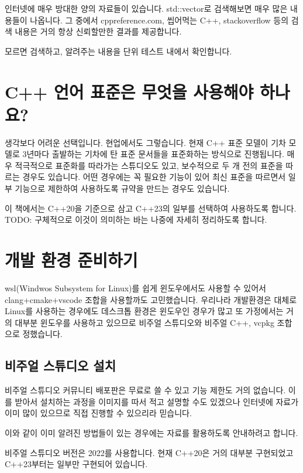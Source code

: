 인터넷에 매우 방대한 양의 자료들이 있습니다. std::vector로 검색해보면 매우 
많은 내용들이 나옵니다. 그 중에서 cppreference.com, 씹어먹는 C++, stackoverflow
등의 검색 내용은 거의 항상 신뢰할만한 결과를 제공합니다. 

모르면 검색하고, 알려주는 내용을 단위 테스트 내에서 확인합니다. 

\section{C++ 언어 표준은 무엇을 사용해야 하나요?}

생각보다 어려운 선택입니다. 현업에서도 그렇습니다. 현재 C++ 표준 모델이 기차 모델로 
3년마다 출발하는 기차에 탄 표준 문서들을 표준화하는 방식으로 진행됩니다. 매우 적극적으로 
표준화를 따라가는 스튜디오도 있고, 보수적으로 두 개 전의 표준을 따르는 경우도 있습니다. 
어떤 경우에는 꼭 필요한 기능이 있어 최신 표준을 따르면서 일부 기능으로 제한하여 
사용하도록 규약을 만드는 경우도 있습니다. 

이 책에서는 C++20을 기준으로 삼고 C++23의 일부를 선택하여 사용하도록 합니다. 
TODO: 구체적으로 이것이 의미하는 바는 나중에 자세히 정리하도록 합니다. 

\section{개발 환경 준비하기}

wsl(Windwos Subsystem for Linux)를 쉽게 윈도우에서도 사용할 수 있어서 clang+cmake+vscode
조합을 사용할까도 고민했습니다. 우리나라 개발환경은 대체로 Linux를 사용하는 경우에도 
데스크톱 환경은 윈도우인 경우가 많고 또 가정에서는 거의 대부분 윈도우를 사용하고 있으므로 
비주얼 스튜디오와 비주얼 C++, vcpkg 조합으로 정했습니다. 

\subsection{비주얼 스튜디오 설치}

비주얼 스튜디오 커뮤니티 배포판은 무료로 쓸 수 있고 기능 제한도 거의 없습니다. 이를 
받아서 설치하는 과정을 이미지를 따서 적고 설명할 수도 있겠으나 인터넷에 자료가 이미 
많이 있으므로 직접 진행할 수 있으리라 믿습니다. 

이와 같이 이미 알려진 방법들이 있는 경우에는 자료를 활용하도록 안내하려고 합니다. 

비주얼 스튜디오 버전은 2022를 사용합니다. 현재 C++20은 거의 대부분 구현되었고 
C++23부터는 일부만 구현되어 있습니다. 

